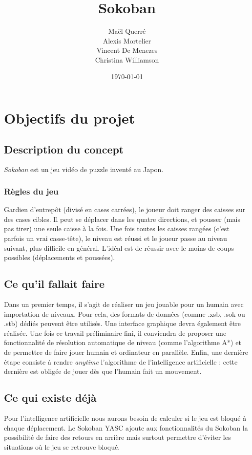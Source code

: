 \documentclass[a4paper, 11pt]{report}
\title{Sokoban}
\date{\today}
\author{Maël Querré\\
        Alexis Mortelier\\
        Vincent De Menezes\\
        Christina Williamson}
\makeatletter
\newcommand{\unicaen}{%
\begin{tikzpicture}
\fill [fill=logo] (-0.2,0) circle (4);
\draw[ligne] (-3,0.52) -- ++(0,-0.83); %
\coordinate (baseu) at (-3,-0.25);
\draw[ligne] (baseu) .. controls +(0,-0.4) and +(-0.1,-0.4) .. (-2.2,-0.28);
\draw[ligne] (-2.2,-0.35) -- ++(0,0.70) -- ++(-45:0.98)
                                                            -- ++(90:0.85);
\draw[cover] (-2.2,-0.52) ++(0,0.87) ++(0:-6.2pt) -- ++(-45:1.4); %
\draw[cover] (-1.51,0.27) node{\footnotesize$\blacksquare$}; %

\draw[ligne] (0.1,1.2) arc (90:270:1.2);
\draw[cover] (-1.1,0) node{\footnotesize$\blacksquare$}; %
\coordinate (triangletop) at (0,0.4);
\draw [ligne] (triangletop) -- ++(60:-1) -- ++(1,0)
                                                  -- ++(-60:-1) -- cycle;
\draw[cover] (triangletop) ++(0:-5pt) -- ++(-60:1.2); %
\draw[ligne] (0.8,0.45) -- ++(0.8,0);
\draw[ligne] (0.8,0) -- ++(0.8,0);
\draw[ligne] (0.8,-0.45) -- ++(0.8,0);
\draw[ligne] (2,-0.52) -- ++(0,0.87) -- ++(-45:0.98)
                                                            -- ++(90:0.85);
\draw[cover] (2,-0.52) ++(0,0.87) ++(0:-6pt) -- ++(-45:1.4); %
\end{tikzpicture}}
\def\@university{}
\def\@department{}
\def\@subject{}
\newcommand{\mytitle}{
  \begin{titlepage} %
  \hbox{
    \parbox[b]{.4\textwidth}{ %
      \resizebox{.3\textwidth}{!}{\unicaen}\\[1em]
      {\noindent\LARGE\textsc\@university}\\[1em] %
      {\noindent\@department} %
      \vskip.65\textheight %
    }
    \rule{1pt}{\textheight} %
    \hspace*{0.05\textwidth} %
    \parbox[b]{0.75\textwidth}{
      {\noindent\Huge\bfseries\@title} %
      \vskip 5em%
      {\large\textit{\@subject}} %
      \vskip 9em%
      \@author %
      \vskip 0.4\textheight %
      {\noindent\@date}\\[\baselineskip] %
    }
  }
  \end{titlepage}
}
\makeatother
\begin{document}
\mytitle

\tableofcontents


\chapter{Objectifs du projet}

\section{Description du concept}

\emph{Sokoban} est un jeu vidéo de puzzle inventé au Japon.

\subsection{Règles du jeu \cite{wiki:Sokoban}}

Gardien d'entrepôt (divisé en cases carrées), le joueur doit ranger des caisses sur des cases cibles. Il peut se déplacer dans les quatre directions, et pousser (mais pas tirer) une seule caisse à la fois. Une fois toutes les caisses rangées (c'est parfois un vrai casse-tête), le niveau est réussi et le joueur passe au niveau suivant, plus difficile en général. L'idéal est de réussir avec le moins de coups possibles (déplacements et poussées).

\section{Ce qu'il fallait faire}

Dans un premier temps, il s'agit de réaliser un jeu jouable pour un humain avec importation de niveaux. Pour cela, des formats de données (comme .xsb, .sok ou .stb) dédiés peuvent être utilisés. Une interface graphique devra également être réalisée. Une fois ce travail préliminaire fini, il conviendra de proposer une fonctionnalité de résolution automatique de niveau (comme l'algorithme A*) et de permettre de faire jouer humain et ordinateur en parallèle. Enfin, une dernière étape consiste à rendre \emph{anytime} l'algorithme de l'intelligence artificielle : cette dernière est obligée de jouer dès que l'humain fait un mouvement.

\section{Ce qui existe déjà}

Pour l'intelligence artificielle nous aurons besoin de calculer si le jeu est bloqué à chaque déplacement. Le Sokoban YASC ajoute aux fonctionnalités du Sokoban la possibilité de faire des retours en arrière mais surtout permettre d'éviter les situations où le jeu se retrouve bloqué.
\end{document}
